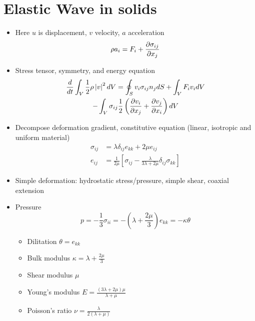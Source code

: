 \section{Elastic Wave in solids}
\begin{itemize}
    \item Here $u$ is displacement, $v$ velocity, $a$ acceleration
    \[\rho a_i = F_i + \frac{\partial{\sigma_{ij}}}{\partial{x_j}} \]
    \item Stress tensor, symmetry, and energy equation
    \begin{multline*}
        \frac{d}{dt} \int_V \frac12 \rho \left| v \right|^2 dV =  \oint_S v_i \sigma_{ij} n_j dS + \int_V F_i v_i dV \\ - \int_V \sigma_{ij} \frac{1}{2} \left(\frac{\partial{v_i}}{\partial{x_j}} + \frac{\partial{v_j}}{\partial{x_i}}\right) dV  
      \end{multline*} 
    \item Decompose deformation gradient, constitutive equation (linear, isotropic and uniform material) 
    \begin{align*}
        \sigma_{ij} &= \lambda\delta_{ij}e_{kk} + 2\mu e_{ij} \\
        e_{ij} &= \frac{1}{2\mu} \left[\sigma_{ij}-\frac{\lambda}{3\lambda+2\mu} \delta_{ij}\sigma_{kk}\right]
    \end{align*}
    \item Simple deformation: hydrostatic stress/pressure, simple shear, coaxial extension
    \item Pressure \[p=-\frac{1}{3}\sigma_{ii} = -\left(\lambda + \frac{2\mu}{3}\right) e_{kk} = -\kappa\theta\]
    
    \begin{itemize}
        \item Dilitation $\theta = e_{kk}$
        \item Bulk modulus $\kappa = \lambda + \frac{2\mu}{3}$
        \item Shear modulus $\mu$
        \item Young's modulus $E = \frac{(3\lambda+2\mu)\mu}{\lambda+\mu}$
        \item Poisson's ratio $\nu = \frac{\lambda}{2(\lambda+\mu)}$
    \end{itemize}
\end{itemize}
